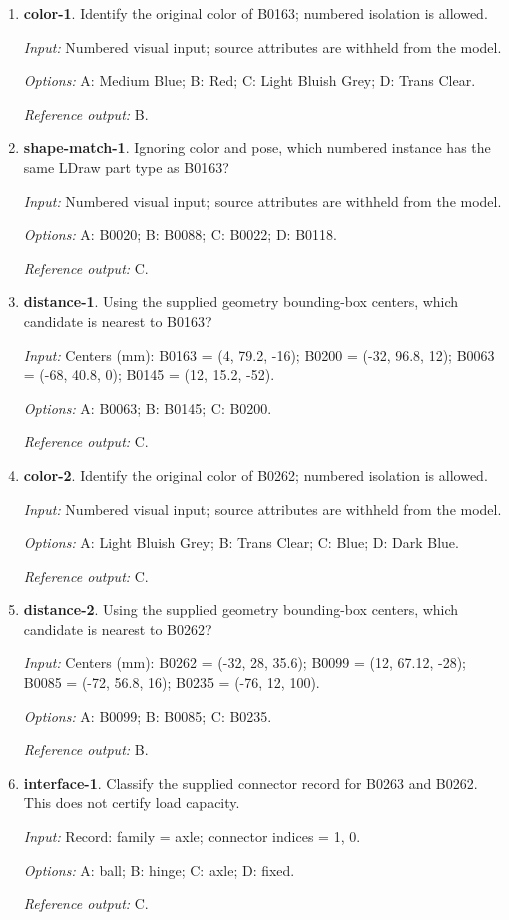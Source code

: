 \begin{enumerate}
\item \textbf{color-1}. Identify the original color of B0163; numbered isolation is allowed.\par {\small \textit{Input:} Numbered visual input; source attributes are withheld from the model. \par\textit{Options:} A: Medium Blue; B: Red; C: Light Bluish Grey; D: Trans Clear. \par\textit{Reference output:} B.}
\item \textbf{shape-match-1}. Ignoring color and pose, which numbered instance has the same LDraw part type as B0163?\par {\small \textit{Input:} Numbered visual input; source attributes are withheld from the model. \par\textit{Options:} A: B0020; B: B0088; C: B0022; D: B0118. \par\textit{Reference output:} C.}
\item \textbf{distance-1}. Using the supplied geometry bounding-box centers, which candidate is nearest to B0163?\par {\small \textit{Input:} Centers (mm): B0163 = (4, 79.2, -16); B0200 = (-32, 96.8, 12); B0063 = (-68, 40.8, 0); B0145 = (12, 15.2, -52). \par\textit{Options:} A: B0063; B: B0145; C: B0200. \par\textit{Reference output:} C.}
\item \textbf{color-2}. Identify the original color of B0262; numbered isolation is allowed.\par {\small \textit{Input:} Numbered visual input; source attributes are withheld from the model. \par\textit{Options:} A: Light Bluish Grey; B: Trans Clear; C: Blue; D: Dark Blue. \par\textit{Reference output:} C.}
\item \textbf{distance-2}. Using the supplied geometry bounding-box centers, which candidate is nearest to B0262?\par {\small \textit{Input:} Centers (mm): B0262 = (-32, 28, 35.6); B0099 = (12, 67.12, -28); B0085 = (-72, 56.8, 16); B0235 = (-76, 12, 100). \par\textit{Options:} A: B0099; B: B0085; C: B0235. \par\textit{Reference output:} B.}
\item \textbf{interface-1}. Classify the supplied connector record for B0263 and B0262. This does not certify load capacity.\par {\small \textit{Input:} Record: family = axle; connector indices = 1, 0. \par\textit{Options:} A: ball; B: hinge; C: axle; D: fixed. \par\textit{Reference output:} C.}

\end{enumerate}
